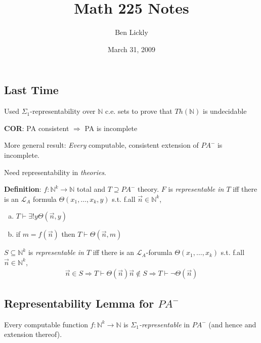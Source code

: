 \documentclass[12pt]{article}
\author{Ben Lickly}
\date{March 31, 2009}
\title{Math 225 Notes}
\newcommand{\Nat}{\ensuremath{\mathbb{N}}}
\newcommand{\proves}{\vdash}
\newcommand{\defn}{\textbf{Definition}: }
\begin{document}
\maketitle

\subsection*{Last Time}
Used $\Sigma_1$-representability over $\Nat$
c.e. sets to prove that $Th(\Nat)$ is undecidable

\textbf{COR}: PA consistent $\Rightarrow$ PA is incomplete

More general result:
\emph{Every} computable, consistent extension of $PA^-$ is incomplete.

Need representability in \emph{theories}.

\defn $f : \Nat^k \rightarrow \Nat$ total
        and $T \supseteq PA^-$ theory.
$F$ is \emph{representable in $T$} iff there is an $\mathcal{L}_A$ formula
$\Theta(x_1, \dots, x_k, y)$ s.t. f.all $\vec{n}\in\Nat^k$,
\begin{enumerate}[(a)]
  \item $T \proves \exists !y \Theta(\vec{n},y)$
  \item if $m = f(\vec{n})$ then $T \proves \Theta(\vec{n}, m)$
\end{enumerate}

$S \subseteq \Nat^k$ is \emph{representable in $T$} iff 
there is an $\mathcal{L}_A$-forumla
$\Theta(x_1, \dots, x_k)$ s.t. f.all $\vec{n} \in \Nat^k$,
\begin{align*}
  \vec{n} \in S \Rightarrow T \proves \Theta(\vec{n})
  \vec{n} \not\in S \Rightarrow T \proves \neg\Theta(\vec{n})
\end{align*}

\subsection*{Representability Lemma for $PA^-$}
Every computable function $f: \Nat^k \rightarrow \Nat$
is \emph{$\Sigma_1$-representable} in $PA^-$ (and hence and extension thereof).
\end{document}
